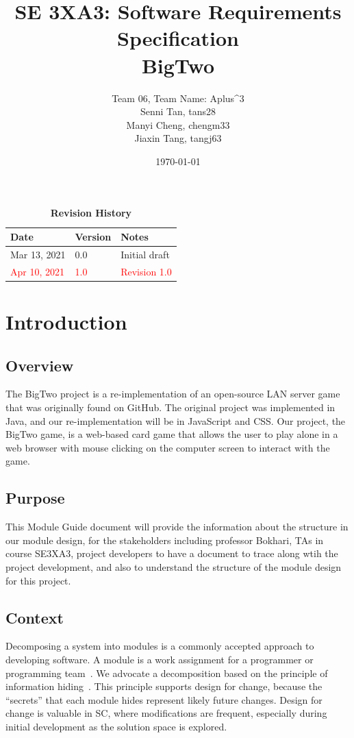\documentclass[12pt, titlepage]{article}
\title{SE 3XA3: Software Requirements Specification\\BigTwo}
\author{Team 06, Team Name: Aplus^3
		\\ Senni Tan, tans28
		\\ Manyi Cheng, chengm33
		\\ Jiaxin Tang, tangj63
}
\date{\today}
\begin{document}
\maketitle

\tableofcontents
\listoftables
\listoffigures

\begin{table}[bp]
\caption{\bf Revision History}
\begin{tabularx}{\textwidth}{p{3cm}p{2cm}X}
\toprule {\bf Date} & {\bf Version} & {\bf Notes}\\
\midrule
Mar 13, 2021 & 0.0 & Initial draft\\
\textcolor{red}{Apr 10, 2021} & \textcolor{red}{1.0} & \textcolor{red}{Revision 1.0}\\
\bottomrule
\end{tabularx}
\end{table}

\newpage


\section{Introduction}
\subsection{Overview}
The BigTwo project is a re-implementation of an open-source LAN server game that was originally found on GitHub. The original project was implemented in Java, and our re-implementation will be in JavaScript and CSS. Our project, the BigTwo game, is a web-based card game that allows the user to play alone in a web browser with mouse clicking on the computer screen to interact with the game.

\subsection{Purpose}
This Module Guide document will provide the information about the structure in our module design, for the stakeholders including professor Bokhari, TAs in course SE3XA3, project developers to have a document to trace along wtih the project development, and also to understand the structure of the module design for this project.

\subsection{Context}
Decomposing a system into modules is a commonly accepted approach to developing
software.  A module is a work assignment for a programmer or programming
team~\citep{ParnasEtAl1984}.  We advocate a decomposition
based on the principle of information hiding~\citep{Parnas1972a}.  This
principle supports design for change, because the ``secrets'' that each module
hides represent likely future changes.  Design for change is valuable in SC,
where modifications are frequent, especially during initial development as the
solution space is explored.  
\end{document}
